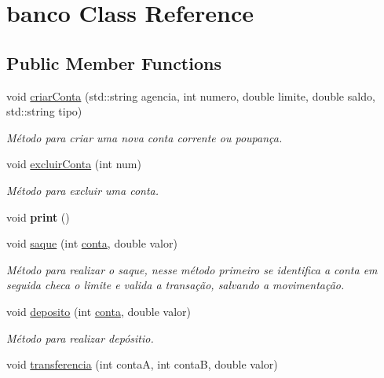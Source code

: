 \hypertarget{classbanco}{}\section{banco Class Reference}
\label{classbanco}
\subsection*{Public Member Functions}
\begin{DoxyCompactItemize}
\item 
void \mbox{\hyperlink{classbanco_a79c3043a6d839b638167b9cb8491c5b5}{criar\+Conta}} (std\+::string agencia, int numero, double limite, double saldo, std\+::string tipo)
\begin{DoxyCompactList}\small\item\em Método para criar uma nova conta corrente ou poupança. \end{DoxyCompactList}\item 
\mbox{\label{classbanco_ac2da6ef968feef36e1333e37e1b8835b}} 
void \mbox{\hyperlink{classbanco_ac2da6ef968feef36e1333e37e1b8835b}{excluir\+Conta}} (int num)
\begin{DoxyCompactList}\small\item\em Método para excluir uma conta. \end{DoxyCompactList}\item 
\mbox{\label{classbanco_ab476edc04466510bb36cb2a4d04c6cce}} 
void {\bfseries print} ()
\item 
void \mbox{\hyperlink{classbanco_a9ae918d40986ad66ba6b06874dd51ceb}{saque}} (int \mbox{\hyperlink{classconta}{conta}}, double valor)
\begin{DoxyCompactList}\small\item\em Método para realizar o saque, nesse método primeiro se identifica a conta em seguida checa o limite e valida a transação, salvando a movimentação. \end{DoxyCompactList}\item 
void \mbox{\hyperlink{classbanco_a5299f885390fee021a84ffb309a0ca2f}{deposito}} (int \mbox{\hyperlink{classconta}{conta}}, double valor)
\begin{DoxyCompactList}\small\item\em Método para realizar depósitio. \end{DoxyCompactList}\item 
void \mbox{\hyperlink{classbanco_a81638b3957b2c422e58df4ace22d0d55}{transferencia}} (int contaA, int contaB, double valor)

\end{DoxyCompactItemize}
